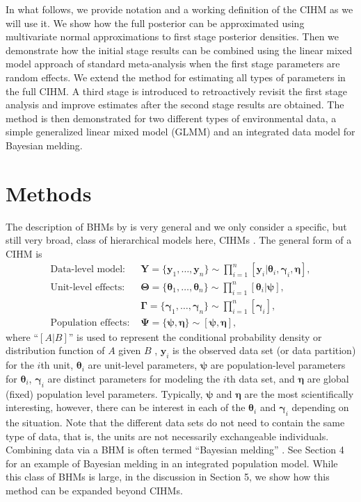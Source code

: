 \documentclass[12pt]{article}
\newcommand{\by}{\mathbf{y}}
\newcommand{\bt}{\boldsymbol{\theta}}
\newcommand{\bn}{\boldsymbol{\eta}}
\newcommand{\bT}{\boldsymbol{\Theta}}
\newcommand{\bp}{\boldsymbol{\psi}}
\newcommand{\bP}{\boldsymbol{\Psi}}
\newcommand{\bg}{\boldsymbol{\gamma}}
\newcommand{\bG}{\boldsymbol{\Gamma}}
\newcommand{\bY}{\mathbf{Y}}
\begin{document}
In what follows, we provide notation and a working definition of the CIHM as we will use it. We show how the full posterior can be approximated using multivariate normal approximations to first stage posterior densities. Then we demonstrate how the initial stage results can be combined using the linear mixed model approach of standard meta-analysis when the first stage parameters are random effects. We extend the method for estimating all types of parameters in the full CIHM. A third stage is introduced to retroactively revisit the first stage analysis and improve estimates after the second stage results are obtained. The method is then demonstrated for two different types of environmental data, a simple generalized linear mixed model (GLMM) and an integrated data model for Bayesian melding. 


\section{Methods}

The description of BHMs by \cite{berliner1996hierarchical} is very general and we only consider a specific, but still very broad, class of hierarchical models here, CIHMs \citep{kass1989approximate,gelfand2015hierarchical}. The general form of a CIHM is
\begin{equation}\label{eq:full.model}
\begin{aligned}
\text{Data-level model: } & \bY = \{\by_1,\dots,\by_n\} \sim \prod_{i=1}^n[\by_i|\bt_i, \bg_i, \bn], \\
\text{Unit-level effects: } & \bT = \{\bt_1,\dots,\bt_n\} \sim \prod_{i=1}^n[\bt_i|\bp],\\
 & \bG = \{\bg_1,\dots,\bg_n\} \sim \prod_{i=1}^n[\bg_i], \\
\text{Population effects: } & \bP = \{\bp,\bn\} \sim [\bp,\bn],
\end{aligned}
\end{equation}
where ``$[A|B]$'' is used to represent the conditional probability density or distribution function of $A$ given $B$ \citep{gelfand1990sampling}, $\by_i$ is the observed data set (or data partition) for the $i$th unit, $\bt_i$ are unit-level parameters, $\bp$ are population-level parameters for $\bt_i$, $\bg_i$ are distinct parameters for modeling the $i$th data set, and $\bn$ are global (fixed) population level parameters. Typically, $\bp$ and $\bn$ are the most scientifically interesting, however, there can be interest in each of the $\bt_i$ and $\bg_i$ depending on the situation. Note that the different data sets do not need to contain the same type of data, that is, the units are not necessarily exchangeable individuals. Combining data via a BHM is often termed ``Bayesian melding''  \citep{goudie2019joining, liu2014bayesian}. See Section 4 for an example of Bayesian melding in an integrated population model. While this class of BHMs is large, in the discussion in Section 5, we show how this method can be expanded beyond CIHMs.
\end{document}
